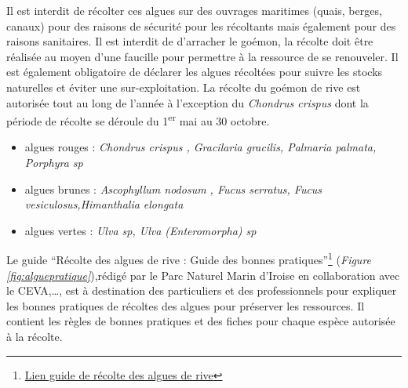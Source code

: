 \documentclass[
]{book}
\begin{document}
Il est interdit de récolter ces algues sur des ouvrages maritimes (quais, berges, canaux) pour des raisons de sécurité pour les récoltants mais également pour des raisons sanitaires. Il est interdit de d'arracher le goémon, la récolte doit être réalisée au moyen d'une faucille pour permettre à la ressource de se renouveler. Il est également obligatoire de déclarer les algues récoltées pour suivre les stocks naturelles et éviter une sur-exploitation.
La récolte du goémon de rive est autorisée tout au long de l'année à l'exception du \emph{Chondrus crispus} dont la période de récolte se déroule du 1\textsuperscript{er} mai au 30 octobre.

\begin{itemize}
\item
  algues rouges : \emph{Chondrus crispus , Gracilaria gracilis, Palmaria palmata, Porphyra sp}
\item
  algues brunes : \emph{Ascophyllum nodosum , Fucus serratus, Fucus vesiculosus,Himanthalia elongata}
\item
  algues vertes : \emph{Ulva sp, Ulva (Enteromorpha) sp}
\end{itemize}

Le guide ``Récolte des algues de rive : Guide des bonnes pratiques''\footnote{\href{http://www.parc-marin-iroise.fr/Documentation/Guide-des-bonnes-pratiques-des-recoltants-d-algues-de-rive/Guide-de-bonnes-pratiques-recolte-des-algues-de-rive}{Lien guide de récolte des algues de rive}} (\emph{Figure \ref{fig:alguepratique}}),rédigé par le Parc Naturel Marin d'Iroise en collaboration avec le CEVA,\ldots, est à destination des particuliers et des professionnels pour expliquer les bonnes pratiques de récoltes des algues pour préserver les ressources. Il contient les règles de bonnes pratiques et des fiches pour chaque espèce autorisée à la récolte.
\end{document}
